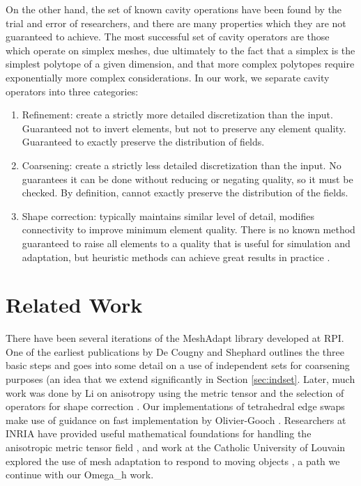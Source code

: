 On the other hand, the set of known cavity operations
have been found by the trial and error of researchers,
and there are many properties which they are not guaranteed to
achieve.
The most successful set of cavity operators are those
which operate on simplex meshes, due ultimately to the
fact that a simplex is the simplest polytope of a given dimension,
and that more complex polytopes require exponentially more
complex considerations.
In our work, we separate cavity operators into three categories:
\begin{enumerate}
\item Refinement: create a strictly more detailed discretization
than the input. Guaranteed not to invert elements, but not to
preserve any element quality. Guaranteed to exactly preserve
the distribution of fields.
\item Coarsening: create a strictly less detailed discretization
than the input. No guarantees it can be done without reducing
or negating quality, so it must be checked.
By definition, cannot exactly preserve the distribution of the fields.
\item Shape correction: typically maintains similar level of detail,
modifies connectivity to improve minimum element quality.
There is no known method guaranteed to raise all elements to a quality
that is useful for simulation and adaptation, but heuristic
methods can achieve great results in practice \cite{klingner2008aggressive}.
\end{enumerate}

\section{Related Work}

There have been several iterations of the MeshAdapt
library developed at RPI.
One of the earliest publications by De Cougny and Shephard
\cite{de1999parallel} outlines the three basic steps and goes into some detail
on a use of independent sets for coarsening purposes
(an idea that we extend significantly in Section \ref{sec:indset}.
Later, much work was done by Li on anisotropy using the metric
tensor and the selection of operators for shape correction
\cite{li20053d,li2003mesh}.
Our implementations of tetrahedral edge swaps make use
of guidance on fast implementation by Olivier-Gooch \cite{freitag1997tetrahedral}.
Researchers at INRIA have provided useful mathematical foundations
for handling the anisotropic metric tensor field
\cite{frey2005,alauzet2006parallel,loseille2015parallel},
and work at the Catholic University of Louvain explored
the use of mesh adaptation to respond to moving objects
\cite{compere2010mesh}, a path we continue with our Omega\_h work.

